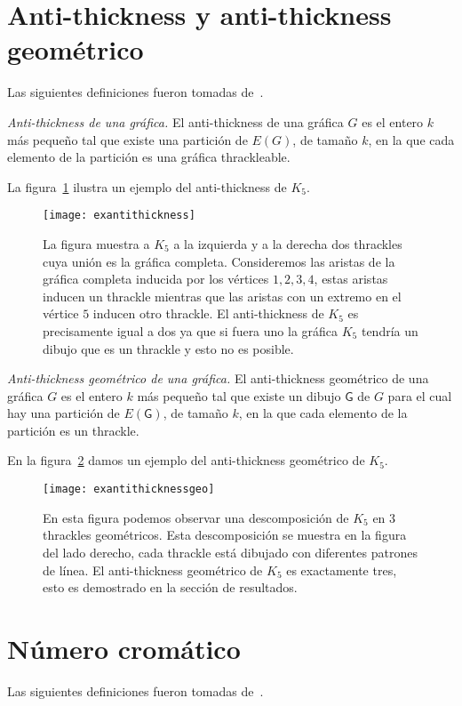 \section{Anti-thickness y anti-thickness geométrico}
Las siguientes definiciones fueron tomadas de~\cite{Dujmovic2017}.
\begin{definition}{\emph{Anti-thickness de una gráfica.}}
  El anti-thickness de una gráfica $G$ es el entero $k$ más pequeño tal que existe una
  partición de $E(G)$, de tamaño $k$, en la que cada elemento de la partición
  es una gráfica thrackleable.
\end{definition}
La figura~\ref{fig:exantithickness} ilustra un ejemplo del anti-thickness de $K_5$.
\begin{figure}[htpb]
  \centering
  \texttt{[image: exantithickness]}
  \caption{La figura muestra a $K_5$ a la izquierda y a la derecha dos thrackles
  cuya unión es la gráfica completa. Consideremos las aristas de la gráfica completa inducida por los vértices $1,2,3,4$,
  estas aristas inducen un thrackle mientras que las aristas con un extremo en el vértice $5$ inducen otro thrackle.
  El anti-thickness de $K_5$ es precisamente igual a dos ya que si fuera uno la gráfica $K_5$ tendría un dibujo
  que es un thrackle y esto no es posible.}
  \label{fig:exantithickness}
\end{figure}
\begin{definition}{\emph{Anti-thickness geométrico de una gráfica.}}
El anti-thickness geométrico de una gráfica $G$ es el entero $k$ más pequeño tal que
existe un dibujo $\mathsf{G}$ de $G$ para el cual hay una partición de $E(\mathsf{G})$,
de tamaño $k$, en la que cada elemento de la partición es un thrackle.
\end{definition}
En la figura~\ref{fig:exantithicknessgeo} damos un ejemplo del anti-thickness geométrico de $K_5$.
\begin{figure}[htpb]
  \centering
  \texttt{[image: exantithicknessgeo]}
  \caption{En esta figura podemos observar una descomposición de $K_5$ en 3 thrackles
  geométricos. Esta descomposición se muestra en la figura del lado derecho, cada
  thrackle está dibujado con diferentes patrones de línea. El anti-thickness geométrico
  de $K_5$ es exactamente tres, esto es demostrado en la sección de resultados.}
  \label{fig:exantithicknessgeo}
\end{figure}
\section{Número cromático}
Las siguientes definiciones fueron tomadas de~\cite{Chartrand2008}.

